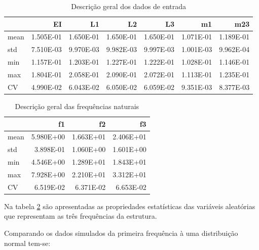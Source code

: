    
    \begin{table}[H]
    \centering
    \caption{Descrição geral dos dados de entrada}
    {\begin{tabular}{lrrrrrr}
\toprule
{} &        EI &        L1 &        L2 &        L3 &        m1 &       m23 \\
\midrule
mean & 1.505E-01 & 1.650E-01 & 1.650E-01 & 1.650E-01 & 1.071E-01 & 1.189E-01 \\
std  & 7.510E-03 & 9.970E-03 & 9.982E-03 & 9.997E-03 & 1.001E-03 & 9.962E-04 \\
min  & 1.157E-01 & 1.203E-01 & 1.227E-01 & 1.222E-01 & 1.028E-01 & 1.146E-01 \\
max  & 1.804E-01 & 2.058E-01 & 2.090E-01 & 2.072E-01 & 1.113E-01 & 1.235E-01 \\
CV   & 4.990E-02 & 6.043E-02 & 6.050E-02 & 6.059E-02 & 9.351E-03 & 8.377E-03 \\
\bottomrule
\end{tabular}
}
    \label{tab:descE}
    \end{table}
    

    
    
    \begin{table}[H]
    \centering
    \caption{Descrição geral das frequências naturais}
    {\begin{tabular}{lrrr}
\toprule
{} &        f1 &        f2 &        f3 \\
\midrule
mean & 5.980E+00 & 1.663E+01 & 2.406E+01 \\
std  & 3.898E-01 & 1.060E+00 & 1.601E+00 \\
min  & 4.546E+00 & 1.289E+01 & 1.843E+01 \\
max  & 7.928E+00 & 2.210E+01 & 3.312E+01 \\
CV   & 6.519E-02 & 6.371E-02 & 6.653E-02 \\
\bottomrule
\end{tabular}
}
    \label{tab:descf}
    \end{table}
    

    
    Na tabela \ref{tab:descf} são apresentadas as propriedades estatísticas
das variáveis aleatórias que representam as três frequências da
estrutura.

Comparando os dados simulados da primeira frequência à uma distribuição
normal tem-se:

